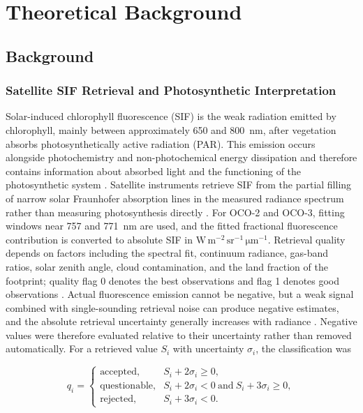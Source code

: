 \chapter{Theoretical Background\label{cha:chapter2}}

\section{Background\label{sec:background}}

\subsection{Satellite SIF Retrieval and Photosynthetic Interpretation}

Solar-induced chlorophyll fluorescence (SIF) is the weak radiation emitted by chlorophyll, mainly between approximately 650 and 800~nm, after vegetation absorbs photosynthetically active radiation (PAR). This emission occurs alongside photochemistry and non-photochemical energy dissipation and therefore contains information about absorbed light and the functioning of the photosynthetic system \cite{doughty2022global,porcar2014linking}. Satellite instruments retrieve SIF from the partial filling of narrow solar Fraunhofer absorption lines in the measured radiance spectrum rather than measuring photosynthesis directly \cite{sun2018overview,doughty2022global}. For OCO-2 and OCO-3, fitting windows near 757 and 771~nm are used, and the fitted fractional fluorescence contribution is converted to absolute SIF in \(\mathrm{W\,m^{-2}\,sr^{-1}\,\mu\mathrm{m}^{-1}}\). Retrieval quality depends on factors including the spectral fit, continuum radiance, gas-band ratios, solar zenith angle, cloud contamination, and the land fraction of the footprint; quality flag 0 denotes the best observations and flag 1 denotes good observations \cite{doughty2022global}. Actual fluorescence emission cannot be negative, but a weak signal combined with single-sounding retrieval noise can produce negative estimates, and the absolute retrieval uncertainty generally increases with radiance \cite{kohler2018global}. Negative values were therefore evaluated relative to their uncertainty rather than removed automatically. For a retrieved value \(S_i\) with uncertainty \(\sigma_i\), the classification was

\begin{equation}
q_i=
\begin{cases}
\text{accepted}, & S_i+2\sigma_i\geq 0,\\
\text{questionable}, & S_i+2\sigma_i<0\ \text{and}\ S_i+3\sigma_i\geq0,\\
\text{rejected}, & S_i+3\sigma_i<0.
\end{cases}
\label{eq:sif_negative_quality}
\end{equation}

